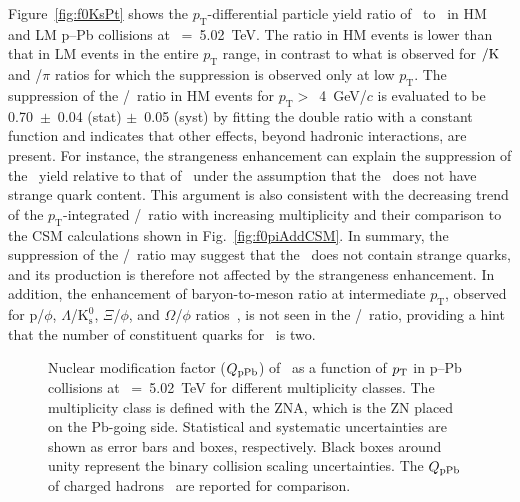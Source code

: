 Figure~\ref{fig:f0KsPt} shows the $p_{\mathrm{T}}$-differential particle yield ratio of \fzero~to \kstar~in HM and LM p--Pb collisions at \snn~=~5.02~TeV. The ratio in HM events is lower than that in LM events in the entire $p_{\mathrm{T}}$ range, in contrast to what is observed for \kstar$\rm{}/K$ and \fzero/$\pi$ ratios for which the suppression is observed only at low $p_{\mathrm{T}}$. The suppression of the \fzero/\kstar~ratio in HM events for $p_{\mathrm{T}}>$~4~GeV/$c$ is evaluated to be 0.70~$\pm$~0.04 (stat) $\pm$~0.05 (syst) by fitting the double ratio with a constant function and indicates that other effects, beyond hadronic interactions, are present. For instance, the strangeness enhancement can explain the suppression of the \fzero~yield relative to that of \kstar~under the assumption that the \fzero~does not have strange quark content. This argument is also consistent with the decreasing trend of the $p_{\mathrm{T}}$-integrated \fzero/\kstar~ratio with increasing multiplicity and their comparison to the CSM calculations shown in Fig.~\ref{fig:f0piAddCSM}. In summary, the suppression of the \fzero/\kstar~ratio may suggest that the \fzero~does not contain strange quarks, and its production is therefore not affected by the strangeness enhancement. In addition, the enhancement of baryon-to-meson ratio at intermediate $p_{\mathrm{T}}$, observed for p/$\phi$, $\Lambda$/$\mathrm{K}_{\mathrm{s}}^{0}$, $\Xi$/$\phi$, and $\Omega$/$\phi$ ratios~\cite{ALICE:2020jsh}, is not seen in the \fzero/\kstar~ratio, providing a hint that the number of constituent quarks for \fzero~is two.

\begin{figure}[!hbt]
	\centering
	\caption{ Nuclear modification factor ($Q_{\rm{pPb}}$) of \fzero~as a function of $p_{\rm{T}}$ in p--Pb collisions at \snn~=~5.02~TeV for different multiplicity classes. The multiplicity class is defined with the ZNA, which is the ZN placed on the Pb-going side. Statistical and systematic uncertainties are shown as error bars and boxes, respectively. Black boxes around unity represent the binary collision scaling uncertainties. The $Q_{\rm{pPb}}$ of charged hadrons~\cite{ALICE:2014xsp} are reported for comparison. }
	\label{fig:QpPb}
\end{figure}

